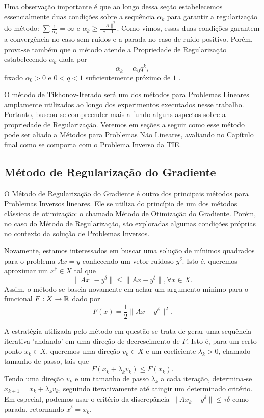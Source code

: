 
Uma observação importante é que ao longo dessa seção estabelecemos essencialmente duas condições sobre a sequência $\alpha_k$ para garantir a regularização do método: $\sum \frac 1 {\alpha_k} = \infty$ e $\alpha_k \geq \frac{\|A\|^2}{c-1}$. Como vimos, essas duas condições garantem a convergência no caso sem ruídos e a parada no caso de ruído positivo. Porém, prova-se também que o método atende a Propriedade de Regularização estabelecendo $\alpha_k$ dada por
\[
\alpha_k = \alpha_0 q^k,
\]
fixado $\alpha_0>0$ e $0<q<1$ suficientemente próximo de $1$ \cite{??}. 

O método de Tikhonov-Iterado será um dos métodos para Problemas Lineares amplamente utilizados ao longo dos experimentos executados nesse trabalho. Portanto, buscou-se compreender mais a fundo alguns aspectos sobre a propriedade de Regularização. Veremos em seções a seguir como esse método pode ser aliado a Métodos para Problemas Não Lineares, avaliando no Capítulo final como se comporta com o Problema Inverso da TIE.

\subsection{Método de Regularização do Gradiente}

O Método de Regularização do Gradiente é outro dos principais métodos para Problemas Inversos lineares. Ele se utiliza do princípio de um dos métodos clássicos de otimização: o chamado Método de Otimização do Gradiente. Porém, no caso do Método de Regularização, são exploradas algumas condições próprias no contexto da solução de Problemas Inversos.

Novamente, estamos interessados em buscar uma solução de mínimos quadrados para o problema $Ax=y$ conhecendo um vetor ruidoso $y^\delta$. Isto é, queremos aproximar um $x^\dag \in X$ tal que
\[
 \| Ax^\dag - y^\delta\| \leq \| Ax-y^\delta\|, \forall x \in X.
\]
Assim, o método se baseia novamente em achar um argumento mínimo para o funcional $F: X \to \mathbb{R}$ dado por
\[
F(x) = \frac 1 2 \| Ax - y^\delta\|^2.
\]

A estratégia utilizada pelo método em questão se trata de gerar uma sequência iterativa 'andando' em uma direção de decrescimento de $F$. Isto é, para um certo ponto $x_k\in X$, queremos uma direção $v_k \in X$ e um coeficiente $\lambda_k>0$, chamado tamanho de passo, tais que
\[
F(x_k + \lambda_k v_k) \leq F(x_k).
\]
Tendo uma direção $v_k$ e um tamanho de passo $\lambda_k$ a cada iteração, determina-se $x_{k+1} = x_k + \lambda_k v_k$, seguindo iterativamente até atingir um determinado critério. Em especial, podemos usar o critério da discrepância $\|Ax_k -y^\delta\|\leq \tau \delta$ como parada, retornando $x^\delta = x_k$.

